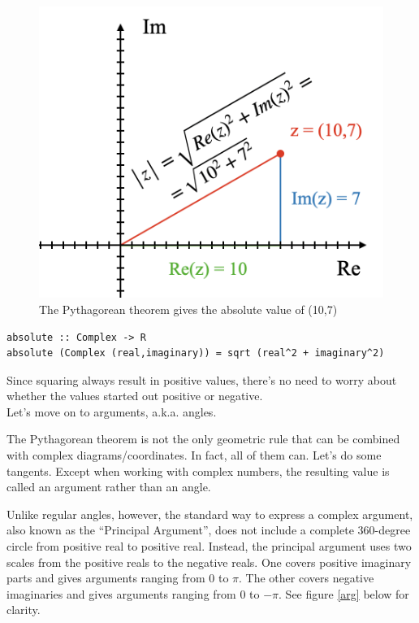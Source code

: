 \begin{figure}[h!]
    \centering
    \includegraphics[scale= 0.4]{abs.png}
    \caption{The Pythagorean theorem gives the absolute value of (10,7)}
    \label{abs}
\end{figure}

\begin{verbatim}
absolute :: Complex -> R
absolute (Complex (real,imaginary)) = sqrt (real^2 + imaginary^2)
\end{verbatim}
Since squaring always result in positive values, there's no need to worry about whether the values started out positive or negative.\\
Let's move on to arguments, a.k.a. angles.

The Pythagorean theorem is not the only geometric rule that can be combined with complex diagrams/coordinates. In fact, all of them can. Let's do some tangents. Except when working with complex numbers, the resulting value is called an argument rather than an angle.

Unlike regular angles, however, the standard way to express a complex argument, also known as the ``Principal Argument'', does not include a complete 360-degree circle from positive real to positive real. Instead, the principal argument uses two scales from the positive reals to the negative reals. One covers positive imaginary parts and gives arguments ranging from 0 to $\pi$. The other covers negative imaginaries and gives arguments ranging from 0 to $-\pi$. See figure \ref{arg} below for clarity.

